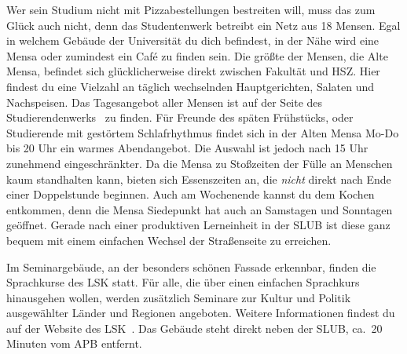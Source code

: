 Wer sein Studium nicht mit Pizzabestellungen bestreiten will, muss das zum Glück auch nicht, denn das Studentenwerk betreibt ein Netz aus 18 Mensen.
Egal in welchem Gebäude der Universität du dich befindest, in der Nähe wird eine Mensa oder zumindest ein Café zu finden sein.
Die größte der Mensen, die Alte Mensa, befindet sich glücklicherweise direkt zwischen Fakultät und HSZ\@.
Hier findest du eine Vielzahl an täglich wechselnden Hauptgerichten, Salaten und Nachspeisen.
Das Tagesangebot aller Mensen ist auf der Seite des Studierendenwerks~ zu finden.
Für Freunde des späten Frühstücks, oder Studierende mit gestörtem Schlafrhythmus findet sich in der Alten Mensa Mo-Do bis 20 Uhr ein warmes Abendangebot.
Die Auswahl ist jedoch nach 15 Uhr zunehmend eingeschränkter.
Da die Mensa zu Stoßzeiten der Fülle an Menschen kaum standhalten kann, bieten sich Essenszeiten an, die \emph{nicht} direkt nach Ende einer Doppelstunde beginnen.
Auch am Wochenende kannst du dem Kochen entkommen, denn die Mensa Siedepunkt hat auch an Samstagen und Sonntagen geöffnet.
Gerade nach einer produktiven Lerneinheit in der SLUB ist diese ganz bequem mit einem einfachen Wechsel der Straßenseite zu erreichen.

Im Seminargebäude, an der besonders schönen Fassade erkennbar, finden die Sprachkurse des LSK statt.
Für alle, die über einen einfachen Sprachkurs hinausgehen wollen, werden zusätzlich Seminare zur Kultur und Politik ausgewählter Länder und Regionen angeboten.
Weitere Informationen findest du auf der Website des LSK~.
Das Gebäude steht direkt neben der SLUB, ca.\ 20 Minuten vom APB entfernt.


